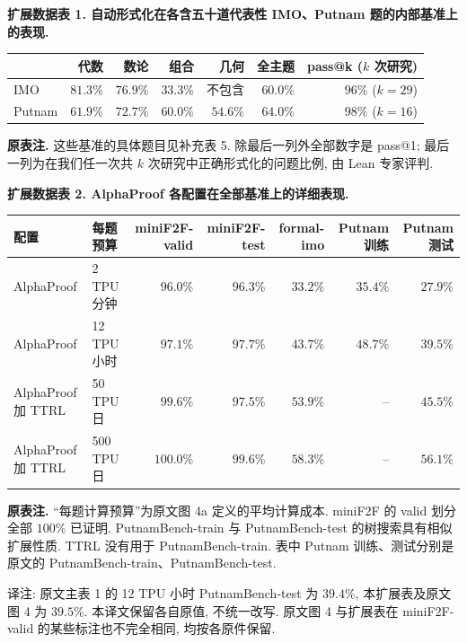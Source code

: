 \noindent\textbf{扩展数据表 1. 自动形式化在各含五十道代表性 IMO、Putnam 题的内部基准上的表现.}
\begin{center}
\begin{tabular}{lrrrrrr}
\toprule
 & 代数 & 数论 & 组合 & 几何 & 全主题 & pass@k ($k$ 次研究)\\
\midrule
IMO & $81.3\%$ & $76.9\%$ & $33.3\%$ & 不包含 & $60.0\%$ & $96\%$ ($k=29$)\\
Putnam & $61.9\%$ & $72.7\%$ & $60.0\%$ & $54.6\%$ & $64.0\%$ & $98\%$ ($k=16$)\\
\bottomrule
\end{tabular}
\end{center}
\noindent\textbf{原表注.} 这些基准的具体题目见补充表 5. 除最后一列外全部数字是 pass@1; 最后一列为在我们任一次共 $k$ 次研究中正确形式化的问题比例, 由 Lean 专家评判.

\noindent\textbf{扩展数据表 2. AlphaProof 各配置在全部基准上的详细表现.}
\begin{center}
\begin{tabular}{p{2.7cm}p{1.9cm}rrrrr}
\toprule
配置 & 每题预算 & miniF2F-valid & miniF2F-test & formal-imo & Putnam 训练 & Putnam 测试\\
\midrule
AlphaProof & 2 TPU 分钟 & $96.0\%$ & $96.3\%$ & $33.2\%$ & $35.4\%$ & $27.9\%$\\
AlphaProof & 12 TPU 小时 & $97.1\%$ & $97.7\%$ & $43.7\%$ & $48.7\%$ & $39.5\%$\\
AlphaProof 加 TTRL & 50 TPU 日 & $99.6\%$ & $97.5\%$ & $53.9\%$ & -- & $45.5\%$\\
AlphaProof 加 TTRL & 500 TPU 日 & $100.0\%$ & $99.6\%$ & $58.3\%$ & -- & $56.1\%$\\
\bottomrule
\end{tabular}
\end{center}
\noindent\textbf{原表注.} “每题计算预算”为原文图 4a 定义的平均计算成本. miniF2F\cite{alphaproof-ref20} 的 valid 划分全部 $100\%$ 已证明. PutnamBench-train 与 PutnamBench-test\cite{alphaproof-ref21} 的树搜索具有相似扩展性质. TTRL 没有用于 PutnamBench-train. 表中 Putnam 训练、测试分别是原文的 PutnamBench-train、PutnamBench-test.

\begin{remark}
译注: 原文主表 1 的 12 TPU 小时 PutnamBench-test 为 $39.4\%$, 本扩展表及原文图 4 为 $39.5\%$. 本译文保留各自原值, 不统一改写. 原文图 4 与扩展表在 miniF2F-valid 的某些标注也不完全相同, 均按各原件保留.
\end{remark}
